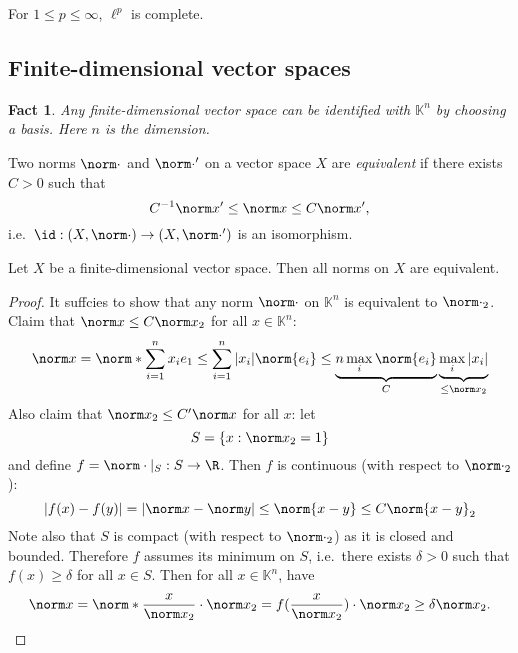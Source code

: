 \documentclass[a4paper]{article}
\newtheorem*{fact}{Fact}
\newcommand{\K}{{\mathbb{K}}} %
\begin{document}
\begin{corollary}
  For \(1 \leq p \leq \infty\), \(\ell^p\) is complete.
\end{corollary}

\subsection{Finite-dimensional vector spaces}

\begin{fact}
  Any finite-dimensional vector space can be identified with \(\K^n\) by choosing a basis. Here \(n\) is the dimension.
\end{fact}

\begin{definition}
  Two norms \(\norm \cdot\) and \(\norm \cdot'\) on a vector space \(X\) are \emph{equivalent} if there exists \(C > 0\) such that
  \[
    C^{-1} \norm x' \leq \norm x \leq C \norm x',
  \]
  i.e.\ \(\id: (X, \norm \cdot) \to (X, \norm \cdot ')\) is an isomorphism.
\end{definition}

\begin{theorem}
  Let \(X\) be a finite-dimensional vector space. Then all norms on \(X\) are equivalent.
\end{theorem}

\begin{proof}
  It suffcies to show that any norm \(\norm \cdot\) on \(\K^n\) is equivalent to \(\norm \cdot_2\). Claim that \(\norm x \leq C \norm x_2\) for all \(x \in \K^n\):
  \[
    \norm x
    = \norm*{\sum_{i = 1}^n x_i e_1}
    \leq \sum_{i = 1}^n |x_i| \norm{e_i}
    \leq \underbrace{n \max_i \norm{e_i}}_{C} \underbrace{\max_i|x_i|}_{\leq \norm x_2}
  \]
  Also claim that \(\norm x_2 \leq C' \norm x\) for all \(x\): let
  \[
    S = \{x: \norm x_2 = 1\}
  \]
  and define \(f = \norm \cdot |_S: S \to \R\). Then \(f\) is continuous (with respect to \(\norm \cdot_2\)):
  \[
    |f(x) - f(y)|
    = |\norm x - \norm y|
    \leq \norm{x - y}
    \leq C\norm{x - y}_2
  \]
  Note also that \(S\) is compact (with respect to \(\norm \cdot_2\)) as it is closed and bounded. Therefore \(f\) assumes its minimum on \(S\), i.e.\ there exists \(\delta > 0\) such that \(f(x) \geq \delta\) for all \(x \in S\). Then for all \(x \in \K^n\), have
  \[
    \norm x = \norm*{\frac{x}{\norm x_2}} \cdot \norm x_2 = f(\frac{x}{\norm x_2}) \cdot \norm x_2
    \geq \delta \norm x_2.
  \]
\end{proof}
\end{document}
